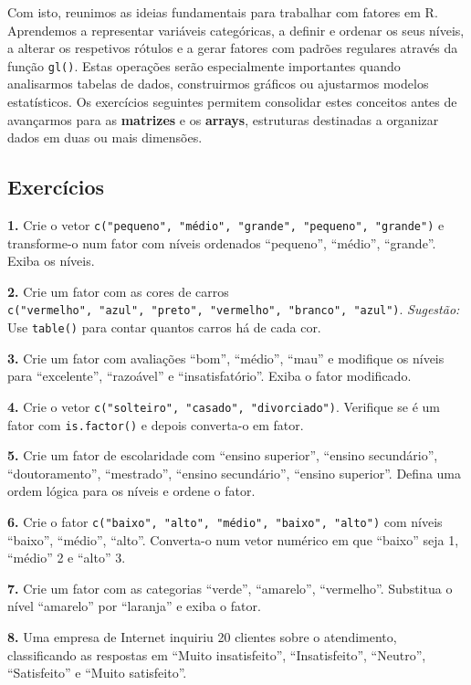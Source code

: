 \documentclass[
  portuguese,
  11pt,
  openany]{book}
\begin{document}
Com isto, reunimos as ideias fundamentais para trabalhar com fatores em R. Aprendemos a representar variáveis categóricas, a definir e ordenar os seus níveis, a alterar os respetivos rótulos e a gerar fatores com padrões regulares através da função \texttt{gl()}. Estas operações serão especialmente importantes quando analisarmos tabelas de dados, construirmos gráficos ou ajustarmos modelos estatísticos. Os exercícios seguintes permitem consolidar estes conceitos antes de avançarmos para as \textbf{matrizes} e os \textbf{arrays}, estruturas destinadas a organizar dados em duas ou mais dimensões.

\subsection{Exercícios}\label{exercuxedcios-2}

\textbf{1.} Crie o vetor \texttt{c("pequeno",\ "médio",\ "grande",\ "pequeno",\ "grande")} e
transforme-o num fator com níveis ordenados ``pequeno'', ``médio'', ``grande''. Exiba os
níveis.

\textbf{2.} Crie um fator com as cores de carros \texttt{c("vermelho",\ "azul",\ "preto",\ "vermelho",\ "branco",\ "azul")}.
\emph{Sugestão:} Use \texttt{table()} para contar quantos carros há de cada cor.

\textbf{3.} Crie um fator com avaliações ``bom'', ``médio'', ``mau'' e modifique os níveis
para ``excelente'', ``razoável'' e ``insatisfatório''. Exiba o fator modificado.

\textbf{4.} Crie o vetor \texttt{c("solteiro",\ "casado",\ "divorciado")}. Verifique se é um
fator com \texttt{is.factor()} e depois converta-o em fator.

\textbf{5.} Crie um fator de escolaridade com ``ensino superior'', ``ensino secundário'',
``doutoramento'', ``mestrado'', ``ensino secundário'', ``ensino superior''. Defina uma
ordem lógica para os níveis e ordene o fator.

\textbf{6.} Crie o fator \texttt{c("baixo",\ "alto",\ "médio",\ "baixo",\ "alto")} com níveis
``baixo'', ``médio'', ``alto''. Converta-o num vetor numérico em que ``baixo'' seja 1,
``médio'' 2 e ``alto'' 3.

\textbf{7.} Crie um fator com as categorias ``verde'', ``amarelo'', ``vermelho''. Substitua o
nível ``amarelo'' por ``laranja'' e exiba o fator.

\textbf{8.} Uma empresa de Internet inquiriu 20 clientes sobre o atendimento,
classificando as respostas em ``Muito insatisfeito'', ``Insatisfeito'', ``Neutro'',
``Satisfeito'' e ``Muito satisfeito''.
\end{document}
